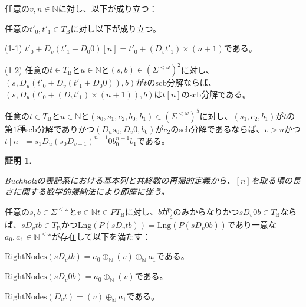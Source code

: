 \documentclass[dvipdfmx,uplatex]{jsarticle}
\theoremstyle{customnonumberbreakfortheorem}
\theoremstyle{customnonumberbreakforproof}
\newtheorem{hideableproof}{証明}
\begin{document}
\begin{proposition}[scb分解と基本列の関係]\label{scb分解と基本列の関係}
	任意の\(v,n \in \mathbb{N}\)に対し、以下が成り立つ：
	\begin{penumerate}
		\item 任意の\(t'_0,t'_1 \in T_{\textrm{B}}\)に対し以下が成り立つ。
		\begin{indented}
			\item[(1-1)] \(t'_0 + D_v(t'_1 + D_0 0)[n] = t'_0 + (D_v t'_1) \times (n+1)\)である。
			\item[(1-2)] 任意の\(t \in T_{\textrm{B}}\)と\(u \in \mathbb{N}\)と\((s,b) \in (\Sigma^{< \omega})^2\)に対し、\((s,D_u(t'_0 + D_v(t'_1+D_0 0)),b)\)が\(t\)のscb分解ならば、\((s,D_u(t'_0 + (D_v t'_1) \times (n+1)),b)\)は\(t[n]\)のscb分解である。
		\end{indented}
		\item 任意の\(t \in T_{\textrm{B}}\)と\(u \in \mathbb{N}\)と\((s_0,s_1,c_2,b_0,b_1) \in (\Sigma^{< \omega})^5\)に対し、\((s_1,c_2,b_1)\)が\(t\)の第\(1\)種scb分解でありかつ\((D_u s_0,D_v 0,b_0)\)が\(c_2\)のscb分解であるならば、\(v > u\)かつ\(t[n] = s_1 D_u (s_0 D_{v-1})^{n+1} 0 b_0^{n+1}b_1\)である。
	\end{penumerate}
\end{proposition}

\begin{hideableproof}
	\begin{indented}
		\item Buchholzの表記系における基本列と共終数の再帰的定義から、\([n]\)を取る項の長さに関する数学的帰納法により即座に従う。
	\end{indented}
\end{hideableproof}
\begin{proposition}\label{RightNodesと部分表現の関係}
	任意の\(s,b \in \Sigma^{< \omega}\)と\(v \in \mathbb{N}\)\(t \in PT_{\textrm{B}}\)に対し、\(b\)が\(\underline{)}\)のみからなりかつ\(s D_v 0 b \in T_{\textrm{B}}\)ならば、\(s D_v t b \in T_{\textrm{B}}\)かつ\(\textrm{Lng}(P(s D_v t b)) = \textrm{Lng}(P(s D_v 0 b))\)であり一意な\(a_0, a_1 \in \mathbb{N}^{< \omega}\)が存在して以下を満たす：
	\begin{penumerate}
		\item \(\textrm{RightNodes}(s D_v t b) = a_0 \oplus_{\mathbb{N}} (v) \oplus_{\mathbb{N}} a_1\)である。
		\item \(\textrm{RightNodes}(s D_v 0 b) = a_0 \oplus_{\mathbb{N}} (v)\)である。
		\item \(\textrm{RightNodes}(D_v t) = (v) \oplus_{\mathbb{N}} a_1\)である。
	\end{penumerate}
\end{proposition}
\end{document}
